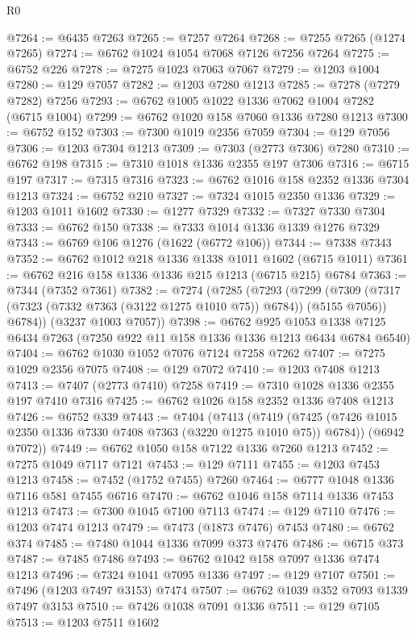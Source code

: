 \begin{lexlean}{R0}
\begin{coremodule}
@7264 := @6435 @7263
@7265 := @7257 @7264
@7268 := @7255 @7265 (@1274 @7265)
@7274 := @6762 @1024 @1054 @7068 @7126 @7256 @7264
@7275 := @6752 @226
@7278 := @7275 @1023 @7063 @7067
@7279 := @1203 @1004
@7280 := @129 @7057
@7282 := @1203 @7280 @1213
@7285 := @7278 (@7279 @7282) @7256
@7293 := @6762 @1005 @1022 @1336 @7062 @1004 @7282 (@6715 @1004)
@7299 := @6762 @1020 @158 @7060 @1336 @7280 @1213
@7300 := @6752 @152
@7303 := @7300 @1019 @2356 @7059
@7304 := @129 @7056
@7306 := @1203 @7304 @1213
@7309 := @7303 (@2773 @7306) @7280
@7310 := @6762 @198
@7315 := @7310 @1018 @1336 @2355 @197 @7306
@7316 := @6715 @197
@7317 := @7315 @7316
@7323 := @6762 @1016 @158 @2352 @1336 @7304 @1213
@7324 := @6752 @210
@7327 := @7324 @1015 @2350 @1336
@7329 := @1203 @1011 @1602
@7330 := @1277 @7329
@7332 := @7327 @7330 @7304
@7333 := @6762 @150
@7338 := @7333 @1014 @1336 @1339 @1276 @7329
@7343 := @6769 @106 @1276 (@1622 (@6772 @106))
@7344 := @7338 @7343
@7352 := @6762 @1012 @218 @1336 @1338 @1011 @1602 (@6715 @1011)
@7361 := @6762 @216 @158 @1336 @1336 @215 @1213 (@6715 @215) @6784
@7363 := @7344 (@7352 @7361)
@7382 := @7274
    (@7285
      (@7293
        (@7299
          (@7309 (@7317 (@7323 (@7332 @7363 (@3122 @1275 @1010 @75)) @6784)) (@5155 @7056))
          @6784))
      (@3237 @1003 @7057))
@7398 := @6762
    @925
    @1053
    @1338
    @7125
    @6434
    @7263
    (@7250 @922 @11 @158 @1336 @1336 @1213 @6434 @6784 @6540)
@7404 := @6762 @1030 @1052 @7076 @7124 @7258 @7262
@7407 := @7275 @1029 @2356 @7075
@7408 := @129 @7072
@7410 := @1203 @7408 @1213
@7413 := @7407 (@2773 @7410) @7258
@7419 := @7310 @1028 @1336 @2355 @197 @7410 @7316
@7425 := @6762 @1026 @158 @2352 @1336 @7408 @1213
@7426 := @6752 @339
@7443 := @7404
    (@7413
      (@7419 (@7425 (@7426 @1015 @2350 @1336 @7330 @7408 @7363 (@3220 @1275 @1010 @75)) @6784))
      (@6942 @7072))
@7449 := @6762 @1050 @158 @7122 @1336 @7260 @1213
@7452 := @7275 @1049 @7117 @7121
@7453 := @129 @7111
@7455 := @1203 @7453 @1213
@7458 := @7452 (@1752 @7455) @7260
@7464 := @6777 @1048 @1336 @7116 @581 @7455 @6716
@7470 := @6762 @1046 @158 @7114 @1336 @7453 @1213
@7473 := @7300 @1045 @7100 @7113
@7474 := @129 @7110
@7476 := @1203 @7474 @1213
@7479 := @7473 (@1873 @7476) @7453
@7480 := @6762 @374
@7485 := @7480 @1044 @1336 @7099 @373 @7476
@7486 := @6715 @373
@7487 := @7485 @7486
@7493 := @6762 @1042 @158 @7097 @1336 @7474 @1213
@7496 := @7324 @1041 @7095 @1336
@7497 := @129 @7107
@7501 := @7496 (@1203 @7497 @3153) @7474
@7507 := @6762 @1039 @352 @7093 @1339 @7497 @3153
@7510 := @7426 @1038 @7091 @1336
@7511 := @129 @7105
@7513 := @1203 @7511 @1602

\end{coremodule}
\end{lexlean}
